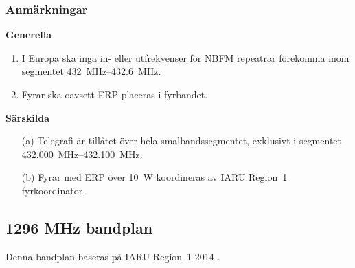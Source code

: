 \subsubsection*{Anmärkningar}

\noindent\textbf{Generella}

\begin{enumerate}[label=\alph*.]
\item I Europa ska inga in- eller utfrekvenser för NBFM repeatrar
förekomma inom segmentet \SIrange{432}{432,6}{\mega\hertz}.
\item Fyrar ska oavsett ERP placeras i fyrbandet.
\end{enumerate}

\noindent\textbf{Särskilda}

\begin{itemize}
\item[(a)] Telegrafi är tillåtet över hela smalbandssegmentet, exklusivt i
segmentet \SIrange{432,000}{432,100}{\mega\hertz}.
\item[(b)] Fyrar med ERP över \SI{10}{\watt} koordineras av IARU Region~1 fyrkoordinator.
\end{itemize}

\newpage

\subsection{1296 MHz bandplan}
\label{1296MHzbandplan}
Denna bandplan baseras på IARU Region~1 2014 \cite{IARU1}.

